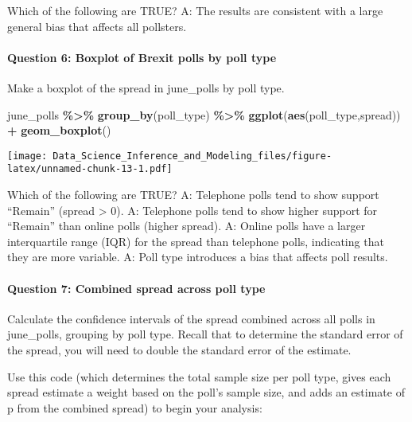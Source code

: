 \documentclass[
]{article}
\newenvironment{Shaded}{\begin{snugshade}}{\end{snugshade}}
\newcommand{\KeywordTok}[1]{\textcolor[rgb]{0.13,0.29,0.53}{\textbf{#1}}}
\newcommand{\NormalTok}[1]{#1}
\newcommand{\OperatorTok}[1]{\textcolor[rgb]{0.81,0.36,0.00}{\textbf{#1}}}
\newcommand{\StringTok}[1]{\textcolor[rgb]{0.31,0.60,0.02}{#1}}
\begin{document}
Which of the following are TRUE? A: The results are consistent with a
large general bias that affects all pollsters.

\hypertarget{question-6-boxplot-of-brexit-polls-by-poll-type}{%
\paragraph{Question 6: Boxplot of Brexit polls by poll
type}\label{question-6-boxplot-of-brexit-polls-by-poll-type}}

Make a boxplot of the spread in june\_polls by poll type.

\begin{Shaded}
\begin{Highlighting}[]
\NormalTok{june\_polls }\OperatorTok{\%\textgreater{}\%}\StringTok{ }\KeywordTok{group\_by}\NormalTok{(poll\_type) }\OperatorTok{\%\textgreater{}\%}
\StringTok{  }\KeywordTok{ggplot}\NormalTok{(}\KeywordTok{aes}\NormalTok{(poll\_type,spread)) }\OperatorTok{+}
\StringTok{  }\KeywordTok{geom\_boxplot}\NormalTok{()}
\end{Highlighting}
\end{Shaded}

\texttt{[image: Data\_Science\_Inference\_and\_Modeling\_files/figure-latex/unnamed-chunk-13-1.pdf]}

Which of the following are TRUE? A: Telephone polls tend to show support
``Remain'' (spread \textgreater{} 0). A: Telephone polls tend to show
higher support for ``Remain'' than online polls (higher spread). A:
Online polls have a larger interquartile range (IQR) for the spread than
telephone polls, indicating that they are more variable. A: Poll type
introduces a bias that affects poll results.

\hypertarget{question-7-combined-spread-across-poll-type}{%
\paragraph{Question 7: Combined spread across poll
type}\label{question-7-combined-spread-across-poll-type}}

Calculate the confidence intervals of the spread combined across all
polls in june\_polls, grouping by poll type. Recall that to determine
the standard error of the spread, you will need to double the standard
error of the estimate.

Use this code (which determines the total sample size per poll type,
gives each spread estimate a weight based on the poll's sample size, and
adds an estimate of p from the combined spread) to begin your analysis:
\end{document}
